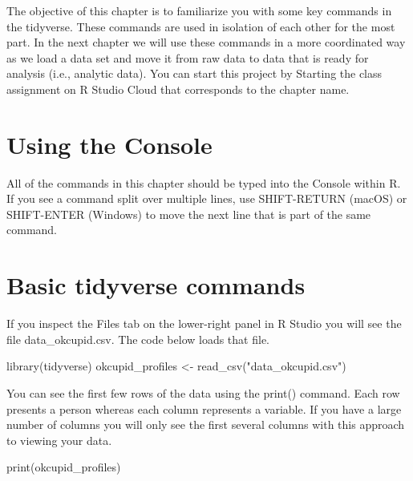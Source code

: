 \documentclass[
]{krantz}
\makeatletter
\newenvironment{Shaded}{\begin{snugshade}}{\end{snugshade}}
\newcommand{\FunctionTok}[1]{\textcolor[rgb]{0,0,0}{#1}}
\newcommand{\NormalTok}[1]{#1}
\newcommand{\OtherTok}[1]{\textcolor[rgb]{0.37,0.37,0.37}{#1}}
\newcommand{\StringTok}[1]{\textcolor[rgb]{0.5,0.5,0.5}{#1}}
\newenvironment{kframe}{%
\medskip{}
\setlength{\fboxsep}{.8em}
 \def\at@end@of@kframe{}%
 \ifinner\ifhmode%
  \def\at@end@of@kframe{\end{minipage}}%
  \begin{minipage}{\columnwidth}%
 \fi\fi%
 \def\FrameCommand##1{\hskip\@totalleftmargin \hskip-\fboxsep
 \colorbox{shadecolor}{##1}\hskip-\fboxsep
     \hskip-\linewidth \hskip-\@totalleftmargin \hskip\columnwidth}%
 \MakeFramed {\advance\hsize-\width
   \@totalleftmargin\z@ \linewidth\hsize
   \@setminipage}}%
 {\par\unskip\endMakeFramed%
 \at@end@of@kframe}
\renewenvironment{Shaded}{\begin{kframe}}{\end{kframe}}
\makeatother
\begin{document}
The objective of this chapter is to familiarize you with some key commands in the tidyverse. These commands are used in isolation of each other for the most part. In the next chapter we will use these commands in a more coordinated way as we load a data set and move it from raw data to data that is ready for analysis (i.e., analytic data). You can start this project by Starting the class assignment on R Studio Cloud that corresponds to the chapter name.

\hypertarget{using-the-console}{%
\section{Using the Console}\label{using-the-console}}

All of the commands in this chapter should be typed into the Console within R. If you see a command split over multiple lines, use SHIFT-RETURN (macOS) or SHIFT-ENTER (Windows) to move the next line that is part of the same command.

\hypertarget{basic-tidyverse-commands}{%
\section{Basic tidyverse commands}\label{basic-tidyverse-commands}}

If you inspect the Files tab on the lower-right panel in R Studio you will see the file data\_okcupid.csv. The code below loads that file.

\begin{Shaded}
\begin{Highlighting}[]
\FunctionTok{library}\NormalTok{(tidyverse)}
\NormalTok{okcupid\_profiles }\OtherTok{\textless{}{-}} \FunctionTok{read\_csv}\NormalTok{(}\StringTok{"data\_okcupid.csv"}\NormalTok{)}
\end{Highlighting}
\end{Shaded}

You can see the first few rows of the data using the print() command. Each row presents a person whereas each column represents a variable. If you have a large number of columns you will only see the first several columns with this approach to viewing your data.

\begin{Shaded}
\begin{Highlighting}[]
\FunctionTok{print}\NormalTok{(okcupid\_profiles)}
\end{Highlighting}
\end{Shaded}
\end{document}
